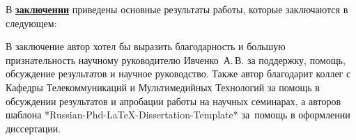 \FloatBarrier
{}                                  %
В \underline{\textbf{заключении}} приведены основные результаты работы, которые заключаются в следующем:


В заключение автор хотел бы выразить благодарность и большую признательность научному руководителю Ивченко~А.\,В. за поддержку, помощь, обсуждение результатов и научное руководство. Также автор благодарит коллег с Кафедры Телекоммуникаций и Мультимедийных Технологий за помощь в обсуждении результатов и апробации работы на научных семинарах, а авторов шаблона *Russian-Phd-LaTeX-Dissertation-Template* за~помощь в оформлении диссертации. 


